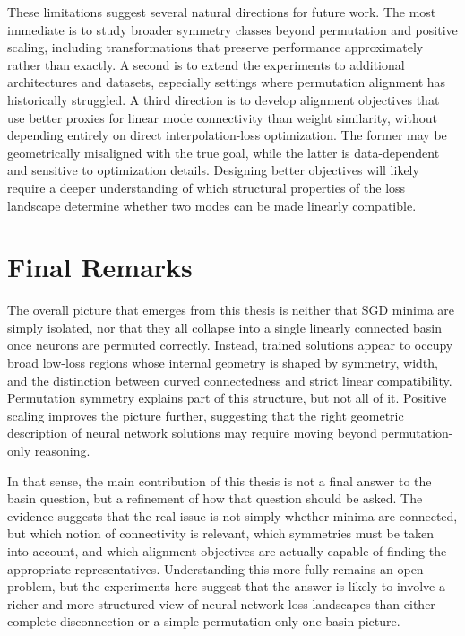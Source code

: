 \documentclass[11pt,a4paper]{report}
\begin{document}
These limitations suggest several natural directions for future work. The most immediate is to study broader symmetry classes beyond permutation and positive scaling, including transformations that preserve performance approximately rather than exactly. A second is to extend the experiments to additional architectures and datasets, especially settings where permutation alignment has historically struggled. A third direction is to develop alignment objectives that use better proxies for linear mode connectivity than weight similarity, without depending entirely on direct interpolation-loss optimization. The former may be geometrically misaligned with the true goal, while the latter is data-dependent and sensitive to optimization details. Designing better objectives will likely require a deeper understanding of which structural properties of the loss landscape determine whether two modes can be made linearly compatible.

\section{Final Remarks}

The overall picture that emerges from this thesis is neither that SGD minima are simply isolated, nor that they all collapse into a single linearly connected basin once neurons are permuted correctly. Instead, trained solutions appear to occupy broad low-loss regions whose internal geometry is shaped by symmetry, width, and the distinction between curved connectedness and strict linear compatibility. Permutation symmetry explains part of this structure, but not all of it. Positive scaling improves the picture further, suggesting that the right geometric description of neural network solutions may require moving beyond permutation-only reasoning.

In that sense, the main contribution of this thesis is not a final answer to the basin question, but a refinement of how that question should be asked. The evidence suggests that the real issue is not simply whether minima are connected, but which notion of connectivity is relevant, which symmetries must be taken into account, and which alignment objectives are actually capable of finding the appropriate representatives. Understanding this more fully remains an open problem, but the experiments here suggest that the answer is likely to involve a richer and more structured view of neural network loss landscapes than either complete disconnection or a simple permutation-only one-basin picture.
\end{document}
